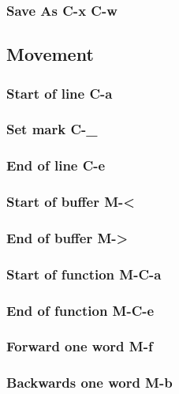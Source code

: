 \documentclass[11pt]{article}
\begin{document}
\subsubsection{Save As C-x C-w}
\label{sec:org4d10ecc}

\subsection{Movement}
\label{sec:org1cfbd12}

\subsubsection{Start of line C-a}
\label{sec:org78c226e}

\subsubsection{Set mark C-\_}
\label{sec:org161e033}

\subsubsection{End of line C-e}
\label{sec:org7284776}

\subsubsection{Start of buffer M-<}
\label{sec:org360047e}

\subsubsection{End of buffer M->}
\label{sec:orge003d0a}

\subsubsection{Start of function M-C-a}
\label{sec:org44318d7}

\subsubsection{End of function M-C-e}
\label{sec:org83e9567}

\subsubsection{Forward one word M-f}
\label{sec:org1e941ce}

\subsubsection{Backwards one word M-b}
\label{sec:org0180bbd}
\end{document}
